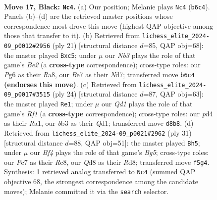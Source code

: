 \documentclass[11pt]{article}
\begin{document}
\clearpage

\begin{figure}[p]\centering
\begin{subfigure}{0.46\textwidth}\centering
\resizebox{\linewidth}{!}{%
\newchessgame
\chessboard[
  setfen={r2qk2r/ppp1b3/nn3pp1/3p1b1p/P2P4/1BN1R2N/RPP2PPP/2BQ2K1 b kq - 11 17},
  showmover=false,
  pgfstyle=straightmove, color=movearrow, markmove={b6-c4}
]}
\caption{}
\end{subfigure}\hfill
\begin{subfigure}{0.46\textwidth}\centering
\resizebox{\linewidth}{!}{%
\newchessgame
\chessboard[
  setfen={r2qk2r/1b1nbppp/p3pn2/1pP5/8/1BN1PN2/PP2QPPP/R1BR2K1 b kq - 2 11},
  showmover=false,
  pgfstyle=straightmove, color=movearrow, markmove={e7-c5}
]}
\caption{}
\end{subfigure}
\\[4pt]
\begin{subfigure}{0.46\textwidth}\centering
\resizebox{\linewidth}{!}{%
\newchessgame
\chessboard[
  setfen={r4rk1/pp2bpp1/1qn1bn1p/3p4/7B/1NN2B2/PPP2PPP/R2Q1RK1 w - - 4 13},
  showmover=false,
  pgfstyle=straightmove, color=movearrow, markmove={f1-e1}
]}
\caption{}
\end{subfigure}\hfill
\begin{subfigure}{0.46\textwidth}\centering
\resizebox{\linewidth}{!}{%
\newchessgame
\chessboard[
  setfen={2rr2k1/4qpp1/1pn1p2p/p1bn4/2N3b1/PQ2PNB1/1P2BPPP/2RR2K1 b - - 1 16},
  showmover=false,
  pgfstyle=straightmove, color=movearrow, markmove={g4-h5}
]}
\caption{}
\end{subfigure}
\caption{\textbf{Move 17, Black: \texttt{Nc4}.} (a) Our position; Melanie plays \texttt{Nc4} (\texttt{b6c4}). Panels (b)--(d) are the retrieved master positions whose correspondence most drove this move (highest QAP objective among those that transfer to it). (b) Retrieved from \texttt{lichess\_elite\_2024-09\_p0012\#2956} (ply 21) [structural distance $d$=85, QAP obj=68]: the master played \texttt{Bxc5}; under $\mu$ our \emph{Nb3} plays the role of that game's \emph{Be2} (a \textbf{cross-type} correspondence); cross-type roles: our \emph{P}g6 as their \emph{R}a8, our \emph{B}e7 as their \emph{N}d7; transferred move \texttt{b6c4} \textbf{(endorses this move)}. (c) Retrieved from \texttt{lichess\_elite\_2024-09\_p0017\#3515} (ply 24) [structural distance $d$=87, QAP obj=63]: the master played \texttt{Re1}; under $\mu$ our \emph{Qd1} plays the role of that game's \emph{Rf1} (a \textbf{cross-type} correspondence); cross-type roles: our \emph{p}d4 as their \emph{R}a1, our \emph{b}b3 as their \emph{Q}d1; transferred move \texttt{d8b8}. (d) Retrieved from \texttt{lichess\_elite\_2024-09\_p0021\#2962} (ply 31) [structural distance $d$=88, QAP obj=51]: the master played \texttt{Bh5}; under $\mu$ our \emph{Bf4} plays the role of that game's \emph{Bg5}; cross-type roles: our \emph{P}c7 as their \emph{R}c8, our \emph{Q}d8 as their \emph{R}d8; transferred move \texttt{f5g4}. Synthesis: 1 retrieved analog transferred to \texttt{Nc4} (summed QAP objective 68, the strongest correspondence among the candidate moves); Melanie committed it via the \texttt{search} selector.}
\label{fig:thought-m33}
\end{figure}
\end{document}

